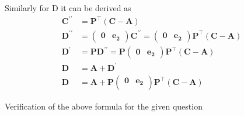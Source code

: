 \documentclass[12pt]{article}
\providecommand{\brak}[1]{\ensuremath{\left(#1\right)}}
\newcommand{\myvec}[1]{\ensuremath{\begin{pmatrix}#1\end{pmatrix}}}
\let\vec\mathbf
\begin{document}
Similarly for D it can be derived as
\begin{align}
\vec{C^{\prime\prime}} &= \vec{P}^\top \brak{\vec{C} - \vec{A}}\\
\vec{D^{\prime\prime}} &= \myvec{
\vec{0} & \vec{e_{2}}
}\vec{C^{\prime\prime}} = \myvec{
\vec{0} & \vec{e_{2}}
}\vec{P}^\top \brak{\vec{C} - \vec{A}}\\
\vec{D^{\prime}} &= \vec{P} \vec{D^{\prime\prime}} = \vec{P} \myvec{
\vec{0} & \vec{e_{2}}
}\vec{P}^\top \brak{\vec{C} - \vec{A}}\\
\vec{D} &= \vec{A}+\vec{D^{\prime}}\\
\vec{D} &= \vec{A} + \vec{P}\myvec{
\vec{0}&\vec{e_{2}}\\
}
\vec{P}^\top\brak{\vec{C}-\vec{A}}
\end{align}


Verification of the above formula for the given question
\end{document}
